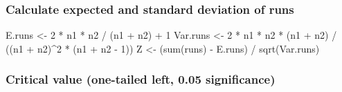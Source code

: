 \documentclass[
]{article}
\newenvironment{Shaded}{\begin{snugshade}}{\end{snugshade}}
\newcommand{\DecValTok}[1]{\textcolor[rgb]{0.00,0.00,0.81}{#1}}
\newcommand{\FunctionTok}[1]{\textcolor[rgb]{0.00,0.00,0.00}{#1}}
\newcommand{\NormalTok}[1]{#1}
\newcommand{\OtherTok}[1]{\textcolor[rgb]{0.56,0.35,0.01}{#1}}
\newcommand{\SpecialCharTok}[1]{\textcolor[rgb]{0.00,0.00,0.00}{#1}}
\begin{document}
\begin{Shaded}
\end{Shaded}

\hypertarget{calculate-expected-and-standard-deviation-of-runs}{%
\subsubsection{Calculate expected and standard deviation of
runs}\label{calculate-expected-and-standard-deviation-of-runs}}

\begin{Shaded}
\begin{Highlighting}[]
\NormalTok{E.runs }\OtherTok{\textless{}{-}} \DecValTok{2} \SpecialCharTok{*}\NormalTok{ n1 }\SpecialCharTok{*}\NormalTok{ n2 }\SpecialCharTok{/}\NormalTok{ (n1 }\SpecialCharTok{+}\NormalTok{ n2) }\SpecialCharTok{+} \DecValTok{1}
\NormalTok{Var.runs }\OtherTok{\textless{}{-}} \DecValTok{2} \SpecialCharTok{*}\NormalTok{ n1 }\SpecialCharTok{*}\NormalTok{ n2 }\SpecialCharTok{*}\NormalTok{ (n1 }\SpecialCharTok{+}\NormalTok{ n2) }\SpecialCharTok{/}\NormalTok{ ((n1 }\SpecialCharTok{+}\NormalTok{ n2)}\SpecialCharTok{\^{}}\DecValTok{2} \SpecialCharTok{*}\NormalTok{ (n1 }\SpecialCharTok{+}\NormalTok{ n2 }\SpecialCharTok{{-}} \DecValTok{1}\NormalTok{))}
\NormalTok{Z }\OtherTok{\textless{}{-}}\NormalTok{ (}\FunctionTok{sum}\NormalTok{(runs) }\SpecialCharTok{{-}}\NormalTok{ E.runs) }\SpecialCharTok{/} \FunctionTok{sqrt}\NormalTok{(Var.runs)}
\end{Highlighting}
\end{Shaded}

\hypertarget{critical-value-one-tailed-left-0.05-significance}{%
\subsubsection{Critical value (one-tailed left, 0.05
significance)}\label{critical-value-one-tailed-left-0.05-significance}}
\end{document}
